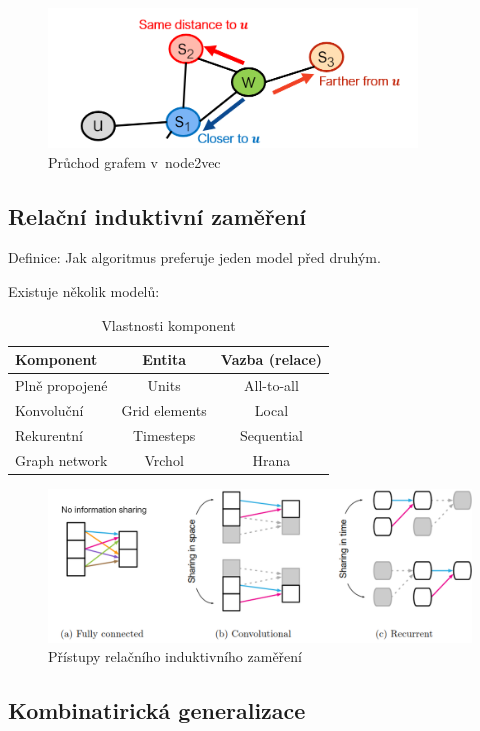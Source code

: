 \begin{figure}
    \centering
	\includegraphics[height=10em]{images/node2vec.png}
    \caption{Průchod grafem v~node2vec}
    \label{pruchod-node2vec}
\end{figure}

\subsection{Relační induktivní zaměření}

Definice: Jak algoritmus preferuje jeden model před druhým. 

Existuje několik modelů:
\begin{table}[ht]
\centering
\caption{Vlastnosti komponent}
\begin{tabular}{|l|c|c|}
\hline
Komponent & Entita & Vazba (relace) \\ \hline \hline
Plně propojené & Units & All-to-all \\ \hline
Konvoluční & Grid elements & Local \\ \hline
Rekurentní & Timesteps & Sequential \\ \hline
Graph network & Vrchol & Hrana \\ \hline
\end{tabular}
\end{table}

\begin{figure}[ht]
    \centering
	\includegraphics[width=\textwidth]{images/11_RIB}
    \caption{Přístupy relačního induktivního zaměření}
\end{figure}

\subsection{Kombinatirická generalizace}

